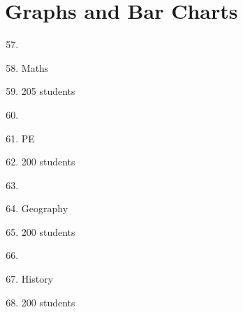 \documentclass[10pt,a4paper]{article}
\begin{document}
\section*{Graphs and Bar Charts}

\begin{enumerate}
\setcounter{enumi}{56}
\item 
\item Maths
\item 205 students
\item 
\item PE
\item 200 students
\item 
\item Geography
\item 200 students
\item 
\item History
\item 200 students
\end{enumerate}
\end{document}
